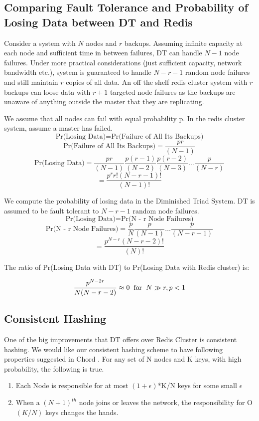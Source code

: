 \documentclass[10pt,twocolumn,letterpaper]{article}
\begin{document}
\subsection{Comparing Fault Tolerance and Probability of Losing Data between DT and Redis}
Consider a system with \(N\) nodes and \(r\) backups. Assuming infinite capacity at each node and sufficient time in between failures, DT can handle \(N-1\) node failures. Under more practical considerations (just sufficient capacity, network bandwidth etc.), system is guaranteed to handle \(N - r - 1\) random node failures and still maintain \(r\) copies of all data.
An off the shelf redis cluster system with \(r\) backups can loose data with \(r + 1\) targeted node failures as the backups are unaware of anything outside the master that they are replicating.

We assume that all nodes can fail with equal probability p. In the redis cluster system, assume a master has failed. 
$$\textrm{Pr(Losing Data)}= \textrm{Pr(Failure of All Its Backups)}$$
$$\textrm{Pr(Failure of All Its Backups)} = \frac{pr }{(N - 1)}$$
$$\textrm{Pr(Losing Data)} =\frac{pr}{(N-1)} \frac{p(r-1)}{(N-2)}  \frac{p(r-2)}{(N-3)}  \dots  \frac{p}{(N-r)}$$
$$=\frac{p^{r}r!(N-r-1)!}{(N-1)!}$$

We compute the probability of losing data in the Diminished Triad System. DT is assumed to be fault tolerant to $N - r - 1$ random node failures.
$$\textrm{Pr(Losing Data)}= \textrm{Pr(N - r  Node Failures)}$$
$$\textrm{Pr(N - r  Node Failures)} = \frac{p}{N} \frac{p}{(N-1)} \dots \frac{p}{(N-r-1)}$$
$$=\frac{p^{N-r}(N-r-2)!}{(N)!}$$

The ratio of Pr(Losing Data with DT) to Pr(Losing Data with Redis cluster) is:

$$\frac{p^{N - 2r}}{N(N-r-2)} \approx 0 \hskip 2mm \textrm{for} \hskip 2mm N \gg r, p < 1$$

\subsection{Consistent Hashing}
One of the big improvements that DT offers over Redis Cluster is consistent hashing. We would like our consistent hashing scheme to have following properties suggested in Chord \cite{chord} \cite{conhash1} \cite{conhash2}.
For any set of N nodes and K keys, with high probability, the following is true.
\begin{enumerate}
\item Each Node is responsible for at most \((1+ \epsilon )\)*K/N keys for some small  \( \epsilon  \)
\item When a \((N+1)^{th}\) node joins or leaves the network, the responsibility for O\((K/N)\) keys changes the hands. 
\end{enumerate}
\end{document}
